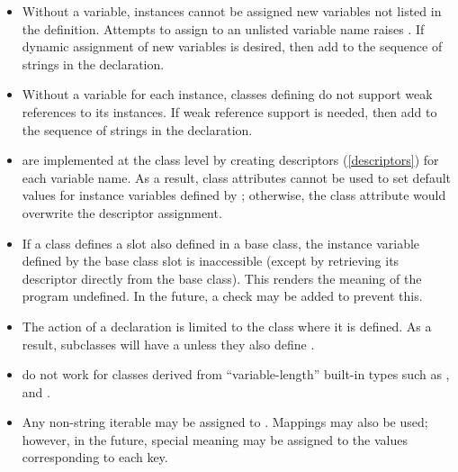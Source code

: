 \begin{itemize}

\item Without a  variable, instances cannot be assigned new
variables not listed in the  definition.  Attempts to assign
to an unlisted variable name raises . If dynamic
assignment of new variables is desired, then add  to the
sequence of strings in the  declaration.                                     

\item Without a  variable for each instance, classes
defining  do not support weak references to its instances.
If weak reference support is needed, then add  to the
sequence of strings in the  declaration.                    

\item {} are implemented at the class level by creating
descriptors (\ref{descriptors}) for each variable name.  As a result,
class attributes cannot be used to set default values for instance
variables defined by ; otherwise, the class attribute would
overwrite the descriptor assignment. 

\item If a class defines a slot also defined in a base class, the instance
variable defined by the base class slot is inaccessible (except by retrieving
its descriptor directly from the base class). This renders the meaning of the
program undefined.  In the future, a check may be added to prevent this.

\item The action of a  declaration is limited to the class
where it is defined.  As a result, subclasses will have a 
unless they also define  .                     

\item {} do not work for classes derived from ``variable-length''
built-in types such as ,  and . 

\item Any non-string iterable may be assigned to .
Mappings may also be used; however, in the future, special meaning may
be assigned to the values corresponding to each key.                      

\end{itemize}


